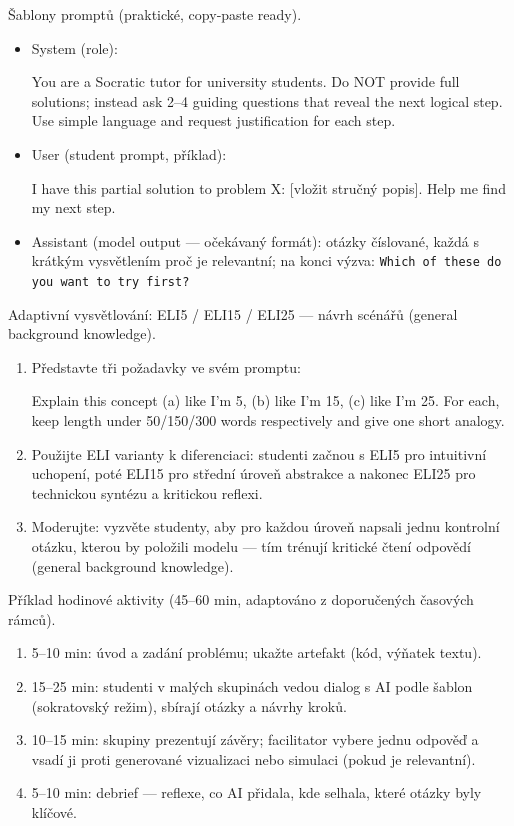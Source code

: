 Šablony promptů (praktické, copy‑paste ready).
\begin{itemize}
  \item System (role): 
\begin{PromptBlock}

You are a Socratic tutor for university students. Do NOT provide full solutions; instead ask 2--4 guiding questions that reveal the next logical step. Use simple language and request justification for each step.
\end{PromptBlock}

  \item User (student prompt, příklad): 
\begin{PromptBlock}

I have this partial solution to problem X: [vložit stručný popis]. Help me find my next step.
\end{PromptBlock}

  \item Assistant (model output — očekávaný formát): otázky číslované, každá s krátkým vysvětlením proč je relevantní; na konci výzva: \texttt{Which of these do you want to try first?}
\end{itemize}

Adaptivní vysvětlování: ELI5 / ELI15 / ELI25 — návrh scénářů (general background knowledge).
\begin{enumerate}
  \item Představte tři požadavky ve svém promptu: 
\begin{PromptBlock}

Explain this concept (a) like I'm 5, (b) like I'm 15, (c) like I'm 25. For each, keep length under 50/150/300 words respectively and give one short analogy.
\end{PromptBlock}

  \item Použijte ELI varianty k diferenciaci: studenti začnou s ELI5 pro intuitivní uchopení, poté ELI15 pro střední úroveň abstrakce a nakonec ELI25 pro technickou syntézu a kritickou reflexi.
  \item Moderujte: vyzvěte studenty, aby pro každou úroveň napsali jednu kontrolní otázku, kterou by položili modelu — tím trénují kritické čtení odpovědí (general background knowledge).
\end{enumerate}

Příklad hodinové aktivity (45--60 min, adaptováno z doporučených časových rámců).
\begin{enumerate}
  \item 5--10 min: úvod a zadání problému; ukažte artefakt (kód, výňatek textu).
  \item 15--25 min: studenti v malých skupinách vedou dialog s AI podle šablon (sokratovský režim), sbírají otázky a návrhy kroků.
  \item 10--15 min: skupiny prezentují závěry; facilitator vybere jednu odpověď a vsadí ji proti generované vizualizaci nebo simulaci (pokud je relevantní).
  \item 5--10 min: debrief — reflexe, co AI přidala, kde selhala, které otázky byly klíčové.
\end{enumerate}

